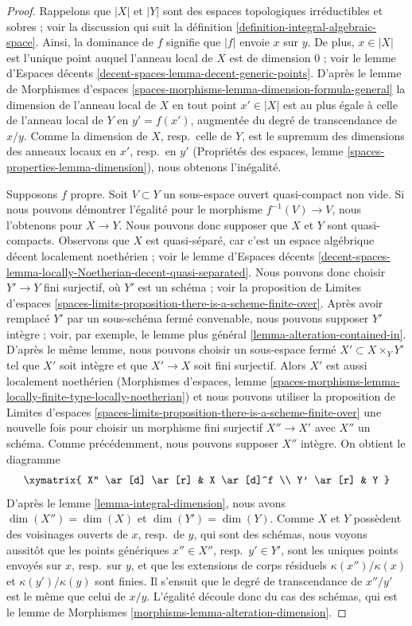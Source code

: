 \begin{proof}
Rappelons que $|X|$ et $|Y|$ sont des espaces topologiques irréductibles et sobres ; voir la
discussion qui suit la définition \ref{definition-integral-algebraic-space}.
Ainsi, la dominance de $f$ signifie que $|f|$ envoie $x$ sur $y$.
De plus, $x \in |X|$ est l'unique point auquel
l'anneau local de $X$ est de dimension $0$ ; voir le
lemme d'Espaces décents \ref{decent-spaces-lemma-decent-generic-points}.
D'après le lemme de Morphismes d'espaces
\ref{spaces-morphisms-lemma-dimension-formula-general}
la dimension de l'anneau local de $X$ en
tout point $x' \in |X|$ est au plus égale à celle de l'anneau local
de $Y$ en $y' = f(x')$, augmentée du degré de transcendance de $x/y$.
Comme la dimension de $X$, resp.\ celle de $Y$, est le
supremum des dimensions des anneaux locaux en $x'$, resp.\ en $y'$
(Propriétés des espaces, lemme \ref{spaces-properties-lemma-dimension}),
nous obtenons l'inégalité.

\medskip\noindent
Supposons $f$ propre.
Soit $V \subset Y$ un sous-espace ouvert quasi-compact non vide.
Si nous pouvons démontrer l'égalité pour le morphisme $f^{-1}(V) \to V$,
nous l'obtenons pour $X \to Y$. Nous pouvons donc supposer que
$X$ et $Y$ sont quasi-compacts.
Observons que $X$ est quasi-séparé, car c'est
un espace algébrique décent localement noethérien ; voir le
lemme d'Espaces décents
\ref{decent-spaces-lemma-locally-Noetherian-decent-quasi-separated}.
Nous pouvons donc choisir $Y' \to Y$ fini surjectif, où $Y'$
est un schéma ; voir la proposition de Limites d'espaces
\ref{spaces-limits-proposition-there-is-a-scheme-finite-over}.
Après avoir remplacé $Y'$ par un sous-schéma fermé convenable, nous
pouvons supposer $Y'$ intègre ; voir, par exemple, le lemme plus général
\ref{lemma-alteration-contained-in}.
D'après le même lemme, nous pouvons choisir un sous-espace fermé
$X' \subset X \times_Y Y'$ tel que $X'$ soit intègre
et que $X' \to X$ soit fini surjectif.
Alors $X'$ est aussi localement noethérien
(Morphismes d'espaces, lemme
\ref{spaces-morphisms-lemma-locally-finite-type-locally-noetherian})
et nous pouvons utiliser la proposition de Limites d'espaces
\ref{spaces-limits-proposition-there-is-a-scheme-finite-over}
une nouvelle fois pour choisir un morphisme fini surjectif $X'' \to X'$
avec $X''$ un schéma. Comme précédemment, nous pouvons supposer $X''$
intègre. On obtient le diagramme
$$
\xymatrix{
X'' \ar[d] \ar[r] & X \ar[d]^f \\
Y' \ar[r] & Y
}
$$
D'après le lemme \ref{lemma-integral-dimension}, nous avons $\dim(X'') = \dim(X)$
et $\dim(Y') = \dim(Y)$. Comme $X$ et $Y$ possèdent des voisinages ouverts
de $x$, resp.\ de $y$, qui sont des schémas, nous voyons aussitôt que les points génériques
$x'' \in X''$, resp.\ $y' \in Y'$, sont les uniques points envoyés
sur $x$, resp.\ sur $y$, et que les extensions de corps résiduels
$\kappa(x'')/\kappa(x)$ et $\kappa(y')/\kappa(y)$ sont finies.
Il s'ensuit que le degré de transcendance de $x''/y'$ est le
même que celui de $x/y$. L'égalité découle donc
du cas des schémas, qui est le
lemme de Morphismes \ref{morphisms-lemma-alteration-dimension}.
\end{proof}





